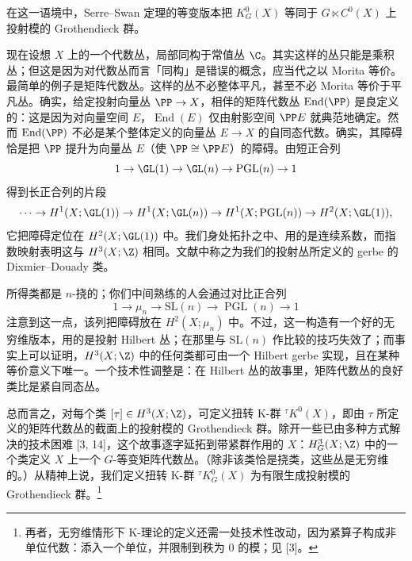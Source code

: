 在这一语境中，Serre--Swan 定理的等变版本把 $K^0_G(X)$ 等同于 $G\ltimes C^0(X)$ 上投射模的 Grothendieck 群。

现在设想 $X$ 上的一个代数丛，局部同构于常值丛 $\C$。其实这样的丛只能是乘积丛；但这是因为对代数丛而言「同构」是错误的概念，应当代之以 Morita 等价。最简单的例子是矩阵代数丛。这样的丛不必整体平凡，甚至不必 Morita 等价于平凡丛。确实，给定投射向量丛 $\PP\to X$，相伴的矩阵代数丛 $\operatorname{End}(\PP)$ 是良定义的：这是因为对向量空间 $E$，$\operatorname{End}(E)$ 仅由射影空间 $\PP E$ 就典范地确定。然而 $\operatorname{End}(\PP)$ 不必是某个整体定义的向量丛 $E\to X$ 的自同态代数。确实，其障碍恰是把 $\PP$ 提升为向量丛 $E$（使 $\PP\cong\PP E$）的障碍。由短正合列
\[
1\to\GL(1)\to\GL(n)\to\operatorname{PGL}(n)\to1
\]
得到长正合列的片段
\[
\cdots\to H^1(X;\GL(1))\to H^1(X;\GL(n))\to H^1(X;\operatorname{PGL}(n))\to H^2(X;\GL(1)),
\]
它把障碍定位在 $H^2(X;\GL(1))$ 中。我们身处拓扑之中、用的是连续系数，而指数映射表明这与 $H^3(X;\Z)$ 相同。文献中称之为我们的投射丛所定义的 gerbe 的 Dixmier--Douady 类。

所得类都是 $n$-挠的；你们中间熟练的人会通过对比正合列
\[
1\to\mu_n\to\mathrm{SL}(n)\to\operatorname{PGL}(n)\to1
\]
注意到这一点，该列把障碍放在 $H^2(X;\mu_n)$ 中。不过，这一构造有一个好的无穷维版本，用的是投射 Hilbert 丛；在那里与 $\mathrm{SL}(n)$ 作比较的技巧失效了；而事实上可以证明，$H^3(X;\Z)$ 中的任何类都可由一个 Hilbert gerbe 实现，且在某种等价意义下唯一。一个技术性调整是：在 Hilbert 丛的故事里，矩阵代数丛的良好类比是紧自同态丛。

总而言之，对每个类 $[\tau]\in H^3(X;\Z)$，可定义扭转 K-群 ${}^\tau K^0(X)$，即由 $\tau$ 所定义的矩阵代数丛的截面上的投射模的 Grothendieck 群。除开一些已由多种方式解决的技术困难 [3, 14]，这个故事逐字延拓到带紧群作用的 $X$：$H^3_G(X;\Z)$ 中的一个类定义 $X$ 上一个 $G$-等变矩阵代数丛。（除非该类恰是挠类，这些丛是无穷维的。）从精神上说，我们定义扭转 K-群 ${}^\tau K^0_G(X)$ 为有限生成投射模的 Grothendieck 群。\footnote{再者，无穷维情形下 K-理论的定义还需一处技术性改动，因为紧算子构成非单位代数：添入一个单位，并限制到秩为 $0$ 的模；见 [3]。}

